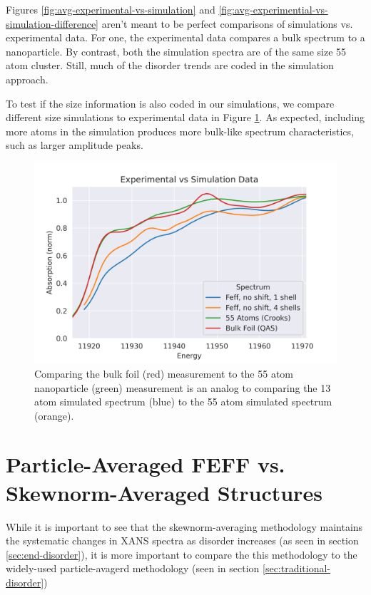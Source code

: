 Figures \ref{fig:avg-experimental-vs-simulation} and \ref{fig:avg-experimential-vs-simulation-difference} aren't meant to be perfect comparisons of simulations vs. experimental data. For one, the experimental data compares a bulk spectrum to a nanoparticle. By contrast, both the simulation spectra are of the same size 55 atom cluster. Still, much of the disorder trends are coded in the simulation approach. 

To test if the size information is also coded in our simulations, we compare different size simulations to experimental data in Figure \ref{fig:avg-experimental-vs-simulation2}. As expected, including more atoms in the simulation produces more bulk-like spectrum characteristics, such as larger amplitude peaks.

\begin{figure}[h]
	\centering
	\includegraphics[width=.7\linewidth]{Chapters/Figures/Bulk_55atom_experimental_theory_comparison.png}
	\caption[Simulation vs. Experimental 2]{Comparing the bulk foil (red) measurement to the 55 atom nanoparticle (green) measurement is an analog to comparing the 13 atom simulated spectrum (blue) to the 55 atom simulated spectrum (orange).}
	\label{fig:avg-experimental-vs-simulation2}
\end{figure}

\section{Particle-Averaged FEFF vs. Skewnorm-Averaged Structures} \label{sec:pa-feff-vs-gaussian-feff}
While it is important to see that the skewnorm-averaging methodology maintains the systematic changes in XANS spectra as disorder increases (as seen in section \ref{sec:end-disorder}), it is more important to compare the this methodology to the widely-used particle-avagerd methodology (seen in section \ref{sec:traditional-disorder})

